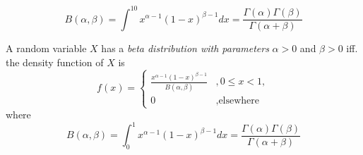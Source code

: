 \begin{definition}
    \[
    B(\alpha, \beta) = \int^10 x^{\alpha - 1}(1 - x)^{\beta - 1} dx = \frac{\Gamma(\alpha)\Gamma(\beta)}{\Gamma(\alpha + \beta)}    
    \]
\end{definition}

\begin{definition}
    A random variable $X$ has a \emph{beta distribution with parameters} 
    $\alpha > 0$ and $\beta > 0$ iff. the density function of $X$ is
    \[
        f(x) =
        \begin{cases}
        \frac{x^{\alpha - 1}(1 - x)^{\beta - 1}}{B(\alpha, \beta)} &, 0 \leq x < 1,\\
        0&, \text{elsewhere}
        \end{cases} 
    \]
    where
    \[
        B(\alpha, \beta) = \int^1_0 x^{\alpha - 1}(1 - x)^{\beta - 1} dx
        = \frac{\Gamma(\alpha)\Gamma(\beta)}{\Gamma(\alpha + \beta)}
    \]
\end{definition}

